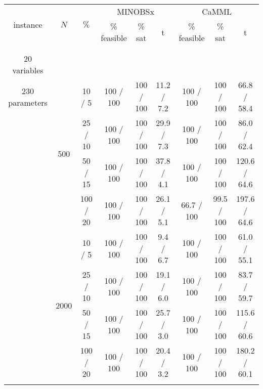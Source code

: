 \documentclass[twoside,11pt]{article}
\begin{document}

\begin{table}[H]
\centering
\scriptsize
\renewcommand\theadfont{}
\begin{tabular}{  c | c | c || c | c | c || c | c | c }


\multirow{2}{*}{instance} & \multirow{2}{*}{$N$} & \multirow{2}{*}{$\%$} & \multicolumn{3}{c||}{MINOBSx} & \multicolumn{3}{c}{CaMML} \\ [2ex]
	& & &  \% feasible & \% sat & t  & \% feasible & \% sat & t  \\
	
\hhline {=|=|=||=|=|=||=|=|=}

\multirow{8}{*}{\thead{\textbf{child} \\ \\ 20 variables \\ 230 parameters}} & \multirow{4}{*}{500} 

& 10 / 5  & 100 / 100 & 100 / 100 & 11.2 / 7.2 & 100 / 100 & 100 / 100 & 66.8 / 58.4 \\
& & 25 / 10 & 100 / 100 & 100 / 100 & 29.9 / 7.3 & 100 / 100 & 100 / 100 & 86.0 / 62.4  \\
& & 50 / 15 & 100 / 100 & 100 / 100 & 37.8 / 4.1 & 100 / 100 & 100 / 100 & 120.6 / 64.6  \\
& & 100 / 20 & 100 / 100 & 100 / 100 & 26.1 / 5.1 & \cellcolor{yellow!100} 66.7 / 100 & \cellcolor{yellow!100}  99.5 / 100 & 197.6 / 64.6 \\

\hhline {~|-|-||-|-|-||-|-|-}

& \multirow{4}{*}{2000}

& 10 / 5 & 100 / 100 & 100 / 100 & 9.4 / 6.7 & 100 / 100 &  100 / 100 & 61.0 / 55.1 \\
& & 25 / 10 & 100 / 100  & 100 / 100 & 19.1 / 6.0 & 100 / 100 & 100 / 100 & 83.7 / 59.7 \\
& & 50 / 15 & 100 / 100 & 100 / 100  & 25.7 / 3.0 & 100 / 100 & 100 / 100 & 115.6 / 60.6 \\
& & 100 / 20 & 100 / 100 & 100 / 100 & 20.4 / 3.2 & 100 / 100 & 100 / 100 & 180.2 / 60.1 \\
 
\hhline {=|=|=||=|=|=||=|=|=}



\end{tabular}
\end{table}
\end{document}
